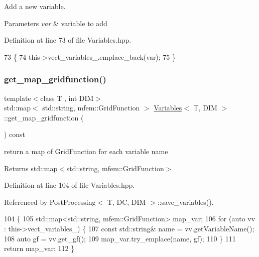 Add a new variable. 


\begin{DoxyParams}{Parameters}
{\em var} & variable to add \\
\hline
\end{DoxyParams}


Definition at line 73 of file Variables.\+hpp.


\begin{DoxyCode}
73                                                 \{
74   this->vect\_variables\_.emplace\_back(var);
75 \}
\end{DoxyCode}
\mbox{\label{classVariables_a7ab9f249a888212662722a2ca0cae69f}} 
\subsubsection{\texorpdfstring{get\+\_\+map\+\_\+gridfunction()}{get\_map\_gridfunction()}}
{\footnotesize\ttfamily template$<$class T , int D\+IM$>$ \\
std\+::map$<$ std\+::string, mfem\+::\+Grid\+Function $>$ \hyperlink{classVariables}{Variables}$<$ T, D\+IM $>$\+::get\+\_\+map\+\_\+gridfunction (\begin{DoxyParamCaption}{ }\end{DoxyParamCaption}) const}



return a map of Grid\+Function for each variable name 

\begin{DoxyReturn}{Returns}
std\+::map$<$std\+::string, mfem\+::\+Grid\+Function$>$ 
\end{DoxyReturn}


Definition at line 104 of file Variables.\+hpp.



Referenced by Post\+Processing$<$ T, D\+C, D\+I\+M $>$\+::save\+\_\+variables().


\begin{DoxyCode}
104                                                                                   \{
105   std::map<std::string, mfem::GridFunction> map\_var;
106   \textcolor{keywordflow}{for} (\textcolor{keyword}{auto} vv : this->vect\_variables\_) \{
107     \textcolor{keyword}{const} std::string& name = vv.getVariableName();
108     \textcolor{keyword}{auto} gf = vv.get\_gf();
109     map\_var.try\_emplace(name, gf);
110   \}
111   \textcolor{keywordflow}{return} map\_var;
112 \}
\end{DoxyCode}
\mbox{\label{classVariables_a264223262f52f484b018cbe3d1f40fa8}} 
